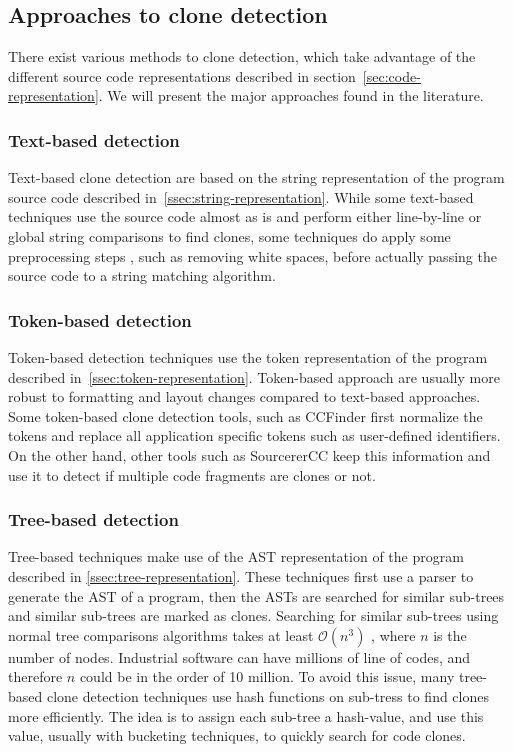 \subsection{Approaches to clone detection}
There exist various methods to clone detection, which take advantage of the
different source code representations described in
section~\ref{sec:code-representation}. We will present the major
approaches found in the literature.
\subsubsection{Text-based detection}
Text-based clone detection are based on the string representation of the program
source code described in~\ref{ssec:string-representation}.
While some text-based techniques use the source code almost as is and perform
either line-by-line or global string comparisons to find clones, some techniques
do apply some preprocessing steps \cite{Baker92aprogram}, such as removing white
spaces, before actually passing the source code to a string matching algorithm.
\subsubsection{Token-based detection}
Token-based detection techniques use the token representation of the program
described in~\ref{ssec:token-representation}. Token-based approach are usually
more robust to formatting and layout changes compared to text-based approaches.
Some token-based clone detection tools, such as CCFinder
\cite{Kamiya:2002:CMT:636188.636191} first normalize the tokens and replace all
application specific tokens such as user-defined identifiers. On the other hand,
other tools such as SourcererCC \cite{Sajnani:2016:SSC:2884781.2884877} keep
this information and use it to detect if multiple code fragments are clones or
not.
\subsubsection{Tree-based detection}
Tree-based techniques make use of the AST representation of the program
described in \ref{ssec:tree-representation}. These techniques first use a parser
to generate the AST of a program, then the ASTs are searched for similar
sub-trees and similar sub-trees are marked as clones. Searching for similar
sub-trees using normal tree comparisons algorithms takes at least
$\mathcal{O}\left(n^3\right)$ \cite{Baxter:1998:CDU:850947.853341}, where $n$ is
the number of nodes. Industrial software can have millions of line of codes, and
therefore $n$ could be in the order of 10 million. To avoid this issue, many
tree-based clone detection techniques \cite{Baxter:1998:CDU:850947.853341,
  Jiang:2007:DSA:1248820.1248843} use hash functions on sub-tress to find clones
more efficiently. The idea is to assign each sub-tree a hash-value, and use this
value, usually with bucketing techniques, to quickly search for code clones.

